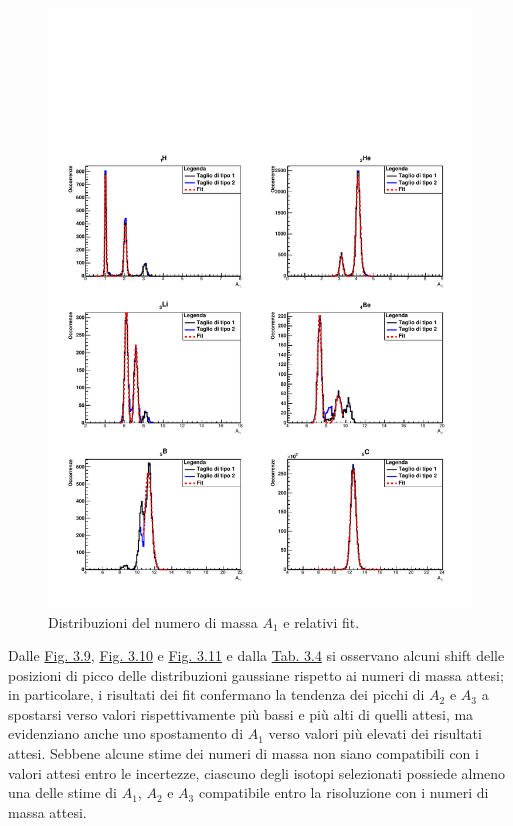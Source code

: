 \documentclass[12pt,a4paper,twoside]{report}
\begin{document}
	\begin{figure}[H]
		\centering
		\includegraphics[width=1.\linewidth]{c_Total_black_blue1.pdf}
		\caption{Distribuzioni del numero di massa $A_1$ e relativi fit.}
		\label{fig:a1_fragments_final}
	\end{figure}
	Dalle \hyperref[fig:a1_fragments_final]{Fig. 3.9}, \hyperref[fig:a2_fragments_final]{Fig. 3.10} e \hyperref[fig:a3_fragments_final]{Fig. 3.11} e dalla \hyperref[tab:mass_numbers]{Tab. 3.4} si osservano alcuni shift delle posizioni di picco delle distribuzioni gaussiane rispetto ai numeri di massa attesi; in particolare, i risultati dei fit confermano la tendenza dei picchi di $A_2$ e $A_3$ a spostarsi verso valori rispettivamente più bassi e più alti di quelli attesi, ma evidenziano anche uno spostamento di $A_1$ verso valori più elevati dei risultati attesi. Sebbene alcune stime dei numeri di massa non siano compatibili con i valori attesi entro le incertezze, ciascuno degli isotopi selezionati possiede almeno una delle stime di $A_1$, $A_2$ e $A_3$ compatibile entro la risoluzione con i numeri di massa attesi.
\end{document}
